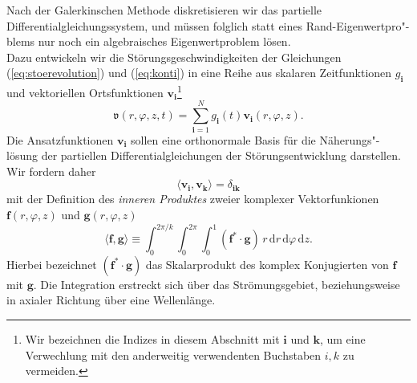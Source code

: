 \documentclass[10pt,a5paper,oneside,draft]{book}
\numberwithin{equation}{chapter}
\begin{document}
Nach der Galerkinschen Methode diskretisieren wir das partielle Differentialgleichungssystem, und m\"ussen folglich statt eines Rand-Eigenwertpro"-blems nur noch ein algebraisches Eigenwertproblem l\"osen.\\

Dazu entwickeln wir die St\"orungsgeschwindigkeiten der Gleichungen (\mbox{\ref{eq:stoerevolution}}) und (\mbox{\ref{eq:konti}}) in eine Reihe aus skalaren Zeitfunktionen $g_\mathbf{i}$ und vektoriellen Ortsfunktionen $\mathbf{v_i}$\footnote{Wir bezeichnen die Indizes in diesem Abschnitt mit $\mathbf{i}$ und $\mathbf{k}$, um eine Verwechlung mit den anderweitig verwendenten Buchstaben $i,k$ zu vermeiden.}
\begin{equation}\label{eq:galerkin:ansatz}
	\mathfrak{v}(r,\varphi,z,t) = \sum_{\mathbf{i}=1}^N g_\mathbf{i}(t) \mathbf{v_i}(r,\varphi,z).
\end{equation}
Die Ansatzfunktionen $\mathbf{v_i}$ sollen eine orthonormale Basis f\"ur die N\"aherungs"-l\"osung der partiellen Differentialgleichungen der St\"orungsentwicklung darstellen.
Wir fordern daher
\begin{equation}
	\langle \mathbf{v_i},  \mathbf{v_k} \rangle = \delta_{\mathbf{ik}}
\end{equation}
mit der Definition des \textit{inneren Produktes} zweier komplexer Vektorfunkionen $\mathbf{f}(r,\varphi,z)$ und $\mathbf{g}(r,\varphi,z)$
\begin{equation}\label{eq:skalarprodukt}
	\langle \mathbf{f},  \mathbf{g} \rangle \equiv \int_0^{2\pi/k}\!\!\!\int_0^{2\pi}\!\!\int_0^1 (\mathbf{f}^*\cdot\mathbf{g})\,r \,\textrm{d}r \,\textrm{d}\varphi \,\textrm{d}z.
\end{equation}
Hierbei bezeichnet $(\mathbf{f}^*\cdot\mathbf{g})$ das Skalarprodukt des komplex Konjugierten von $\mathbf{f}$ mit $\mathbf{g}$.
Die Integration erstreckt sich \"uber das Str\"omungsgebiet, beziehungsweise in axialer Richtung \"uber eine Wellenl\"ange.\\
\end{document}
